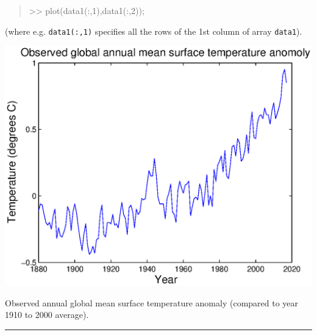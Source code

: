 \documentclass{tufte-book} %
\newenvironment{docspec}{\begin{quotation}\ttfamily\parskip0pt\parindent0pt\ignorespaces}{\end{quotation}}
\begin{document}
\begin{docspec}
>> plot(data1(:,1),data1(:,2));
\end{docspec}

\noindent (where e.g. \texttt{data1(:,1)} specifies all the rows of the 1st column of array \texttt{data1}).

\begin{marginfigure}[-4.5in]
\includegraphics[width=\linewidth]{ch1-plot-temperature1.eps}
\caption{Observed annual global mean surface temperature anomaly (compared to year 1910 to 2000 average).}
\label{fig:ch1-plot-temperature1}
\end{marginfigure}

\vspace{1mm}
\noindent\rule{4cm}{0.5pt}
\vspace{2mm}
\end{document}
